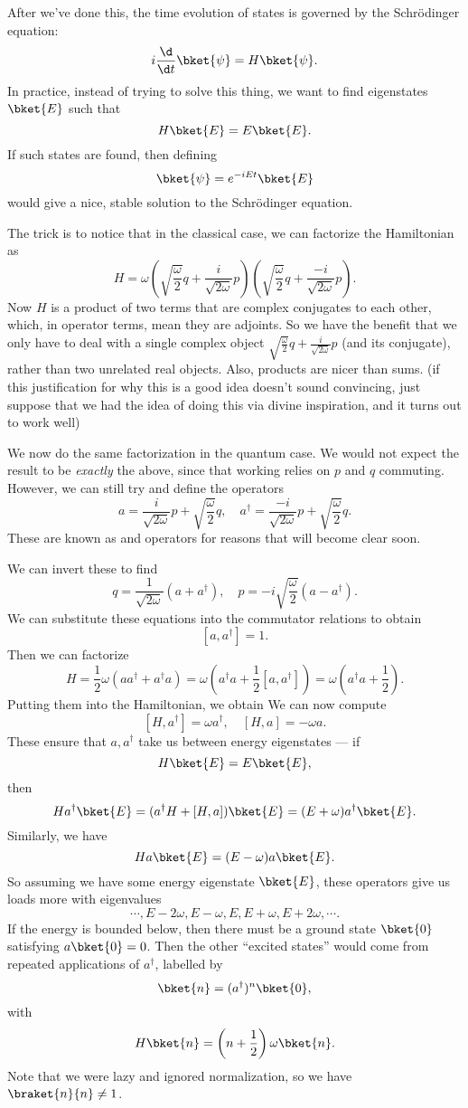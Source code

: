 \documentclass[a4paper]{article}
\begin{document}
After we've done this, the time evolution of states is governed by the Schr\"odinger equation:
\[
  i\frac{\d}{\d t}\bket{\psi} = H\bket{\psi}.
\]
In practice, instead of trying to solve this thing, we want to find eigenstates $\bket{E}$ such that
\[
  H \bket{E} = E\bket{E}.
\]
If such states are found, then defining
\[
  \bket{\psi} = e^{-iEt}\bket{E}
\]
would give a nice, stable solution to the Schr\"odinger equation.

The trick is to notice that in the classical case, we can factorize the Hamiltonian as
\[
  H = \omega \left(\sqrt{\frac{\omega}{2}}q + \frac{i}{\sqrt{2\omega}}p\right)\left(\sqrt{\frac{\omega}{2}}q + \frac{-i}{\sqrt{2\omega}}p\right).
\]
Now $H$ is a product of two terms that are complex conjugates to each other, which, in operator terms, mean they are adjoints. So we have the benefit that we only have to deal with a single complex object $\sqrt{\frac{\omega}{2}}q + \frac{i}{\sqrt{2\omega}}p$ (and its conjugate), rather than two unrelated real objects. Also, products are nicer than sums. (if this justification for why this is a good idea doesn't sound convincing, just suppose that we had the idea of doing this via divine inspiration, and it turns out to work well)

We now do the same factorization in the quantum case. We would not expect the result to be \emph{exactly} the above, since that working relies on $p$ and $q$ commuting. However, we can still try and define the operators
\[
  a = \frac{i}{\sqrt{2 \omega}}p + \sqrt{\frac{\omega}{2}}q,\quad a^\dagger = \frac{-i}{\sqrt{2\omega}}p + \sqrt{\frac{\omega}{2}}q.
\]
These are known as  and  operators for reasons that will become clear soon.

We can invert these to find
\[
  q = \frac{1}{\sqrt{2\omega}}(a + a^\dagger),\quad p = -i\sqrt{\frac{\omega}{2}} (a - a^\dagger).
\]
We can substitute these equations into the commutator relations to obtain
\[
  [a, a^\dagger] = 1.
\]
Then we can factorize
\[
  H = \frac{1}{2}\omega(a a^\dagger + a^\dagger a) = \omega\left(a^\dagger a + \frac{1}{2}[a, a^\dagger]\right) = \omega \left(a^\dagger a + \frac{1}{2}\right).
\]
Putting them into the Hamiltonian, we obtain
We can now compute
\[
  [H, a^\dagger] = \omega a^\dagger,\quad [H, a] = -\omega a.
\]
These ensure that $a, a^\dagger$ take us between energy eigenstates --- if
\[
  H\bket{E} = E \bket{E},
\]
then
\[
  Ha^\dagger\bket{E} = (a^\dagger H + [H, a]) \bket{E} = (E + \omega)a^\dagger \bket{E}.
\]
Similarly, we have
\[
  Ha\bket{E} = (E - \omega)a\bket{E}.
\]
So assuming we have some energy eigenstate $\bket{E}$, these operators give us loads more with eigenvalues
\[
  \cdots, E - 2\omega, E - \omega, E, E + \omega, E + 2\omega, \cdots.
\]
If the energy is bounded below, then there must be a ground state $\bket{0}$ satisfying $a \bket{0} = 0$. Then the other ``excited states'' would come from repeated applications of $a^\dagger$, labelled by
\[
  \bket{n} = (a^\dagger)^n \bket{0},
\]
with
\[
  H\bket{n} = \left(n + \frac{1}{2}\right)\omega \bket{n}.
\]
Note that we were lazy and ignored normalization, so we have $\braket{n}{n} \not= 1$.
\end{document}
